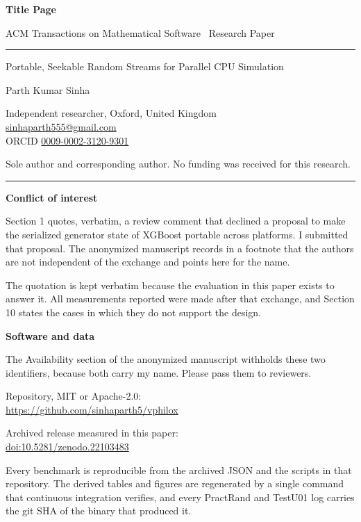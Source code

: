 \documentclass[11pt,a4paper]{article}
\begin{document}
{\sffamily\bfseries\large Title Page}\par
\vspace{2pt}
{\small\sffamily ACM Transactions on Mathematical Software \textbar\ Research Paper}

\vspace{16pt}
\hrule
\vspace{20pt}

{\LARGE Portable, Seekable Random Streams for Parallel CPU Simulation\par}

\vspace{22pt}

{\large Parth Kumar Sinha\par}
\vspace{4pt}
Independent researcher, Oxford, United Kingdom\\
\href{mailto:sinhaparth555@gmail.com}{sinhaparth555@gmail.com}\\
ORCID \href{https://orcid.org/0009-0002-3120-9301}{0009-0002-3120-9301}

\vspace{4pt}
Sole author and corresponding author. No funding was received for this research.

\vspace{24pt}
\hrule
\vspace{20pt}

{\sffamily\bfseries Conflict of interest}

Section 1 quotes, verbatim, a review comment that declined a proposal to make
the serialized generator state of XGBoost portable across platforms. I
submitted that proposal. The anonymized manuscript records in a footnote that
the authors are not independent of the exchange and points here for the name.

The quotation is kept verbatim because the evaluation in this paper exists to
answer it. All measurements reported were made after that exchange, and Section
10 states the cases in which they do not support the design.

\vspace{20pt}

{\sffamily\bfseries Software and data}

The Availability section of the anonymized manuscript withholds these two
identifiers, because both carry my name. Please pass them to reviewers.

\vspace{6pt}
Repository, MIT or Apache-2.0:\\
\url{https://github.com/sinhaparth5/vphilox}

\vspace{6pt}
Archived release measured in this paper:\\
\href{https://doi.org/10.5281/zenodo.22103483}{doi:10.5281/zenodo.22103483}

\vspace{6pt}
Every benchmark is reproducible from the archived JSON and the scripts in that
repository. The derived tables and figures are regenerated by a single command
that continuous integration verifies, and every PractRand and TestU01 log
carries the git SHA of the binary that produced it.
\end{document}
